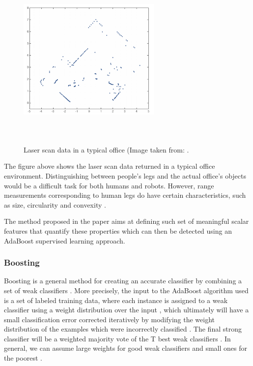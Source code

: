 \begin{figure}[!htbp]
\begin{center}
\includegraphics[width=7cm,height=9cm,keepaspectratio]{images/laser-data.png}
\end{center}
\caption{Laser scan data in a typical office (Image taken from: \cite{arras2007using}.}
\end{figure}

The figure above shows the laser scan data returned in a typical office environment. Distinguishing between people's legs and the actual office's objects would be a difficult task for both humans and robots. However, range measurements corresponding to human legs do have certain characteristics, such as size, circularity and convexity \cite{arras2007using}.

The method proposed in the paper aims at defining such set of meaningful scalar features that quantify these properties which can then be detected using an AdaBoost supervised learning approach.

\subsubsection{Boosting}

Boosting is a general method for creating an accurate classifier by combining a set of weak classifiers \cite{arras2007using}. More precisely, the input to the AdaBoost algorithm used is a set of labeled training data, where each instance is assigned to a weak classifier using a weight distribution over the input \cite{arras2007using}, which ultimately will have a small classification error corrected iteratively by modifying the weight distribution of the examples which were incorrectly classified \cite{arras2007using}. The final strong classifier will be a weighted majority vote of the T best weak classifiers \cite{arras2007using}. In general, we can assume large weights for good weak classifiers and small ones for the poorest \cite{arras2007using}.

